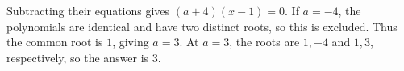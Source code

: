 Subtracting their equations gives $(a+4)(x-1)=0$. If $a=-4$, the polynomials are identical and have two distinct roots, so this is excluded. Thus the common root is $1$, giving $a=3$. At $a=3$, the roots are $1,-4$ and $1,3$, respectively, so the answer is $\boxed3$.

